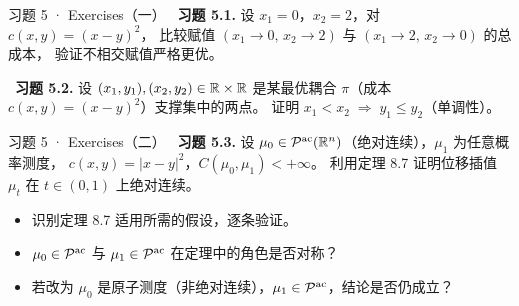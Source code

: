 \begin{frame}{习题 5 · Exercises（一）}
  \diffI\ \textbf{习题 5.1.} 设 $x_1=0$，$x_2=2$，对 $c(x,y)=(x-y)^2$，
  比较赋值 $(x_1\to 0,\,x_2\to 2)$ 与 $(x_1\to 2,\,x_2\to 0)$ 的总成本，
  验证不相交赋值严格更优。


  \vspace{6pt}
  \diffII\ \textbf{习题 5.2.} 设 $(x_1,y_1),(x_2,y_2)\in\mathbb{R}\times\mathbb{R}$ 是某最优耦合
  $\pi$（成本 $c(x,y)=(x-y)^2$）支撑集中的两点。
  证明 $x_1<x_2\;\Rightarrow\;y_1\le y_2$（单调性）。


\end{frame}

\begin{frame}{习题 5 · Exercises（二）}
  \diffIII\ \textbf{习题 5.3.} 设 $\mu_0\in\mathcal{P}^{\mathrm{ac}}(\mathbb{R}^n)$（绝对连续），$\mu_1$ 为任意概率测度，
  $c(x,y)=|x-y|^2$，$C(\mu_0,\mu_1)<+\infty$。
  利用定理 8.7 证明位移插值 $\mu_t$ 在 $t\in(0,1)$ 上绝对连续。

  \begin{itemize}
    \item[(a)] 识别定理 8.7 适用所需的假设，逐条验证。
    \item[(b)] $\mu_0\in\mathcal{P}^{\mathrm{ac}}$ 与 $\mu_1\in\mathcal{P}^{\mathrm{ac}}$ 在定理中的角色是否对称？
    \item[(c)] 若改为 $\mu_0$ 是原子测度（非绝对连续），$\mu_1\in\mathcal{P}^{\mathrm{ac}}$，结论是否仍成立？
  \end{itemize}


\end{frame}


